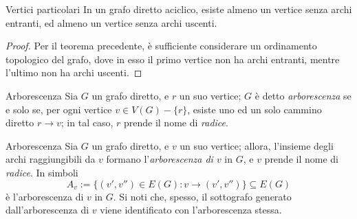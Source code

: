 \documentclass[a4paper, 12pt]{report}
\begin{document}
    \begin{framedcor}{Vertici particolari}
        \label{vertici particolari}
        In un grafo diretto aciclico, esiste almeno un vertice senza archi entranti, ed almeno un vertice senza archi uscenti.
    \end{framedcor}

    \begin{proof}
        Per il teorema precedente, è sufficiente considerare un ordinamento topologico del grafo, dove in esso il primo vertice non ha archi entranti, mentre l'ultimo non ha archi uscenti.
    \end{proof}

    \begin{frameddefn}{Arborescenza}
        Sia $G$ un grafo diretto, e $r$ un suo vertice; $G$ è detto \textit{arborescenza} se e solo se, per ogni vertice $v \in V(G) - \{r\}$, esiste uno ed un solo cammino diretto $r \rightarrow v$; in tal caso, $r$ prende il nome di \textit{radice}.
    \end{frameddefn}

    \begin{framedobs}{Arborescenza}
        Sia $G$ un grafo diretto, e $v$ un suo vertice; allora, l'insieme degli archi raggiungibili da $v$ formano l'\textit{arborescenza di $v$} in $G$, e $v$ prende il nome di \textit{radice}. In simboli $$A_v := \{(v', v'') \in E(G) : v \rightarrow (v', v'')\} \subseteq E(G)$$ è l'arborescenza di $v$ in $G$. Si noti che, spesso, il sottografo generato dall'arborescenza di $v$ viene identificato con l'arborescenza stessa.
    \end{framedobs}
\end{document}

